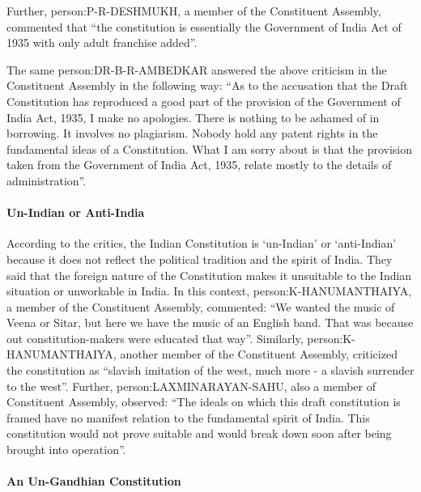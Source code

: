 Further, \gls{person:P-R-DESHMUKH}, a member of the Constituent Assembly, commented that ``the constitution is essentially the Government of India Act of 1935 with only adult franchise added''.

The same \gls{person:DR-B-R-AMBEDKAR} answered the above criticism in the Constituent Assembly in the following way: ``As to the accusation that the Draft Constitution has reproduced a good part of the provision of the Government of India Act, 1935, I make no apologies. There is nothing to be ashamed of in borrowing. It involves no plagiarism. Nobody hold any patent rights in the fundamental ideas of a Constitution. What I am sorry about is that the provision taken from the Government of India Act, 1935, relate mostly to the details of administration''.

\paragraph{Un-Indian or Anti-India}

According to the critics, the Indian Constitution is `un-Indian' or `anti-Indian' because it does not reflect the political tradition and the spirit of India. They said that the foreign nature of the Constitution makes it unsuitable to the Indian situation or unworkable in India. In this context, \gls{person:K-HANUMANTHAIYA}, a member of the Constituent Assembly, commented: ``We wanted the music of Veena or Sitar, but here we have the music of an English band. That was because out constitution-makers were educated that way''. Similarly, \gls{person:K-HANUMANTHAIYA}, another member of the Constituent Assembly, criticized the constitution as ``slavish imitation of the west, much more - a slavish surrender to the west''. Further, \gls{person:LAXMINARAYAN-SAHU}, also a member of Constituent Assembly, observed: ``The ideals on which this draft constitution is framed have no manifest relation to the fundamental spirit of India. This constitution would not prove suitable and would break down soon after being brought into operation''.

\paragraph{An Un-Gandhian Constitution}

